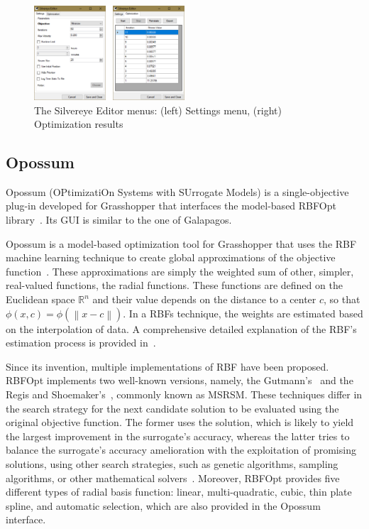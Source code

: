 \begin{figure}
	\centering
	\includegraphics[width=0.5\textwidth]{Images/Background/Silvereye/general-view.png}
	\caption[Silvereye optimization plug-in menus]{The Silvereye Editor menus: (left) Settings menu, (right) Optimization results}
	\label{fig:silvereye}
\end{figure}

\subsection{Opossum}

Opossum (OPtimizatiOn Systems with SUrrogate Models) is a single-objective plug-in developed for Grasshopper that interfaces the model-based RBFOpt library~\cite{RBFOPT}. Its \ac{GUI} is similar to the one of Galapagos.

Opossum is a model-based optimization tool for Grasshopper that uses the \ac{RBF} machine learning technique to create global approximations of the objective function~\cite{Forrester2009SBO}. These approximations are simply the weighted sum of other, simpler, real-valued functions, the radial functions. These functions are defined on the Euclidean space $\mathbb{R}^n$ and their value depends on the distance to a center $c$, so that $\phi(x, c) = \phi(\left\lVert x-c \right\rVert)$. In a \acp{RBF} technique, the weights are estimated based on the interpolation of data. A comprehensive detailed explanation of the \ac{RBF}'s estimation process is provided in~\cite{Forrester2009SBO}. 

Since its invention, multiple implementations of \ac{RBF} have been proposed. RBFOpt implements two well-known versions, namely, the Gutmann's~\cite{Gutmann2001} and the Regis and Shoemaker's~\cite{Regis2007}, commonly known as MSRSM. These techniques differ in the search strategy for the next candidate solution to be evaluated using the original objective function. The former uses the solution, which is likely to yield the largest improvement in the surrogate's accuracy, whereas the latter tries to balance the surrogate's accuracy amelioration with the exploitation of promising solutions, using other search strategies, such as genetic algorithms, sampling algorithms, or other mathematical solvers~\cite{Wortmann2017Opossum}. Moreover, RBFOpt provides five different types of radial basis function: linear, multi-quadratic, cubic, thin plate spline, and automatic selection, which are also provided in the Opossum interface.

